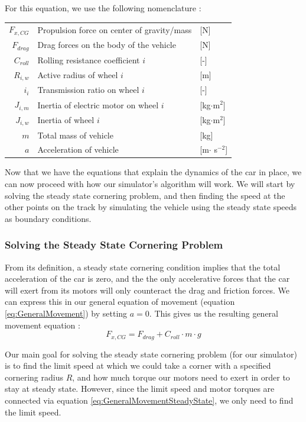 \documentclass[a4paper, 11pt]{article}
\begin{document}
For this equation, we use the following nomenclature :
\begin{table}[H]
	\centering
	\begin{tabular}{r | l  l}
		$F_{x,CG}$ & Propulsion force on center of gravity/mass & [N]\\
		$F_{drag}$ & Drag forces on the body of the vehicle & [N]\\
		$C_{roll}$ & Rolling resistance coefficient $i$ & [-]\\
		$R_{i,w}$ & Active radius of wheel $i$ & [m]\\
		$i_{i}$ & Transmission ratio on wheel $i$ & [-]\\
		$J_{i,m}$ & Inertia of electric motor on wheel $i$ & [kg$\cdot$m$^2$]\\
		$J_{i,w}$ & Inertia of wheel $i$ & [kg$\cdot$m$^2$]\\
		$m$ & Total mass of vehicle & [kg]\\
		$a$ & Acceleration of vehicle & [m$\cdot$ s$^{-2}$]
	\end{tabular}
\end{table}

Now that we have the equations that explain the dynamics of the car in place, we can now proceed with how our simulator's algorithm will work. We will start by solving the steady state cornering problem, and then finding the speed at the other points on the track by simulating the vehicle using the steady state speeds as boundary conditions.

\subsubsection{Solving the Steady State Cornering Problem}

From its definition, a steady state cornering condition implies that the total acceleration of the car is zero, and the the only accelerative forces that the car will exert from its motors will only counteract the drag and friction forces. We can express this in our general equation of movement (equation \ref{eq:GeneralMovement}) by setting $a=0$. This gives us the resulting general movement equation :
\begin{equation}
	F_{x,CG} = F_{drag} + C_{roll}\cdot m\cdot g
	\label{eq:GeneralMovementSteadyState}
\end{equation}

Our main goal for solving the steady state cornering problem (for our simulator) is to find the limit speed at which we could take a corner with a specified cornering radius $R$, and how much torque our motors need to exert in order to stay at steady state. However, since the limit speed and motor torques are connected via equation \ref{eq:GeneralMovementSteadyState}, we only need to find the limit speed.
\end{document}
